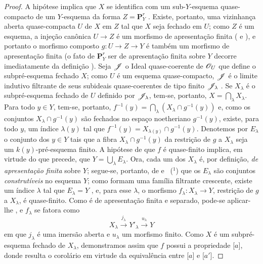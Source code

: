 \begin{proof}
A hipótese implica que $X$ se identifica com um sub-$Y$-esquema quase-compacto de um $Y$-esquema da forma $Z=\mathbf{P}^r_Y$ .
Existe, portanto, uma vizinhança aberta quase-compacta $U$ de $X$ em $Z$ tal que $X$ seja fechado em $U$; como $Z$ é um esquema, a injeção canônica $U\to Z$ é um morfismo de apresentação finita ( e ), e portanto o morfismo composto $g:U\to Z\to Y$ é também um morfismo de apresentação finita (o fato de $\mathbf{P}^r_Y$ ser de apresentação finita sobre $Y$ decorre imediatamente da definição ).
Seja $\mathscr{J}$ o Ideal quase-coerente de $\mathscr{O}_U$ que define o subpré-esquema fechado $X$; como $U$ é um esquema quase-compacto, $\mathscr{J}$ é o limite indutivo filtrante de seus subideais quase-coerentes de tipo finito $\mathscr{J}_\lambda$ .
Se $X_\lambda$ é o subpré-esquema fechado de $U$ definido por $\mathscr{J}_\lambda$, tem-se, portanto, $X=\bigcap_\lambda X_\lambda$.
Para todo $y\in Y$, tem-se, portanto, $f^{-1}(y)=\bigcap_\lambda(X_\lambda\cap g^{-1}(y))$ e, como os conjuntos $X_\lambda\cap g^{-1}(y)$ são fechados no espaço noetheriano $g^{-1}(y)$, existe, para todo $y$, um índice $\lambda(y)$ tal que $f^{-1}(y)=X_{\lambda(y)}\cap g^{-1}(y)$.
Denotemos por $E_\lambda$ o conjunto dos $y\in Y$ tais que a fibra $X_\lambda\cap g^{-1}(y)$ da restrição de $g$ a $X_\lambda$ seja um $k(y)$-pré-esquema finito.
A hipótese de que $f$ é quase-finito implica, em virtude do que precede, que $Y=\bigcup_\lambda E_\lambda$.
Ora, cada um dos $X_\lambda$ é, por definição, \emph{de apresentação finita} sobre $Y$; segue-se, portanto, de  e ~($^1$) que os $E_\lambda$ são conjuntos \emph{construtíveis} no esquema $Y$; como formam uma família filtrante crescente, existe um índice $\lambda$ tal que $E_\lambda=Y$ , e, para esse $\lambda$, o morfismo $f_\lambda:X_\lambda\to Y$, restrição de $g$ a $X_\lambda$, é quase-finito. Como é de apresentação finita e separado, pode-se aplicar-lhe , e $f_\lambda$ se fatora como
\[
X_\lambda\xrightarrow{j_\lambda}Y'_\lambda\xrightarrow{u_\lambda}Y
\]
em que $j_\lambda$ é uma imersão aberta e $u_\lambda$ um morfismo finito.
Como $X$ é um subpré-esquema fechado de $X_\lambda$, demonstramos assim que $f$ possui a propriedade [$a$], donde resulta o corolário em virtude da equivalência entre [$a$] e [$a'$].
\end{proof}

